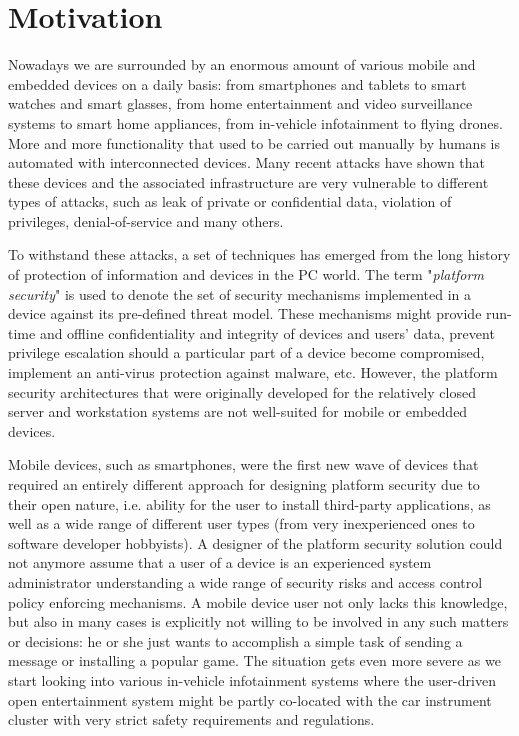 
\section{Motivation}

Nowadays we are surrounded by an enormous amount of various mobile and embedded devices on a daily basis: from smartphones and tablets to smart watches and smart glasses, from home entertainment and video surveillance systems to smart home appliances, from in-vehicle infotainment to flying drones. More and more functionality that used to be carried out manually by humans is automated with interconnected devices. Many recent attacks have shown that these devices and the associated infrastructure are very vulnerable to different types of attacks, such as leak of private or confidential data, violation of privileges, denial-of-service and many others. 

To withstand these attacks, a set of techniques has emerged from the long history of protection of information and devices in the PC world. The term "\textit{platform security}" is used to denote the set of security mechanisms implemented in a device against its pre-defined threat model. These mechanisms might provide run-time and offline confidentiality and integrity of devices and users' data, prevent privilege escalation should a particular part of a device become compromised, implement an anti-virus protection against malware, etc. However, the platform security architectures that were originally developed for the relatively closed server and workstation systems are not well-suited for mobile or embedded devices. 

Mobile devices, such as smartphones, were the first new wave of devices that required an entirely different approach for designing platform security due to their open nature, i.e. ability for the user to install third-party applications, as well as a wide range of different user types (from very inexperienced ones to software developer hobbyists). A designer of the platform security solution could not anymore assume that a user of a device is an experienced system administrator understanding a wide range of security risks and access control policy enforcing mechanisms. A mobile device user not only lacks this knowledge, but also in many cases is explicitly not willing to be involved in any such matters or decisions: he or she just wants to accomplish a simple task of sending a message or installing a popular game. The situation gets even more severe as we start looking into various in-vehicle infotainment systems where the user-driven open entertainment system might be partly co-located with the car instrument cluster with very strict safety requirements and regulations. 

